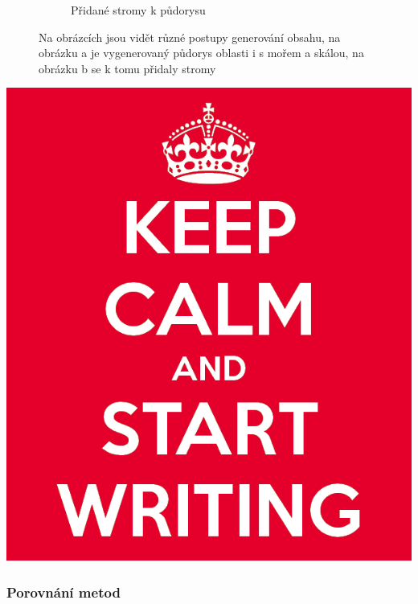 \begin{description}
\begin{figure}
\begin{subfigure}[b]{0.475\textwidth}
			\caption{Přidané stromy k půdorysu}
		\end{subfigure}
		\caption{Na obrázcích jsou vidět různé postupy generování obsahu, na obrázku a je vygenerovaný půdorys oblasti i s mořem a skálou, na obrázku b se k tomu přidaly stromy}
	\end{figure}

	
\end{description} 



\includegraphics[scale=0.3]{obrazky-figures/keep-calm.png}

\textcolor{gray}{\blindtext[4]}


\subsubsection{Porovnání metod}
\textcolor{gray}{\blindtext[8]}

